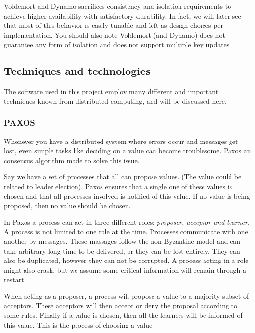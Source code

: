 Voldemort and Dynamo sacrifices consistency and isolation requirements to achieve higher availability with satisfactory durability.
In fact, we will later see that most of this behavior is easily tunable and left as design choices per implementation.
You should also note Voldemort (and Dynamo) does not guarantee any form of isolation and does not support multiple key updates.

\subsection{Techniques and technologies}
The software used in this project employ many different and important techniques known from distributed computing, and will be discussed here.

\subsubsection{PAXOS}
Whenever you have a distributed system where errors occur and messages get lost, even simple tasks like deciding on a value can become troublesome. Paxos an consensus algorithm made to solve this issue. 

Say we have a set of processes that all can propose values. (The value could be related to leader election). Paxos ensures that a single one of these values is chosen and that all processes involved is notified of this value. If no value is being proposed, then no value should be chosen. 

In Paxos a process can act in three different roles: {\it proposer, acceptor and learner}. A process is not limited to one role at the time. Processes communicate with one another by messages. These massages follow the non-Byzantine model and can take arbitrary long time to be delivered, or they can be lost entirely. They can also be duplicated, however they can not be corrupted. A process acting in a role might also crash, but we assume some critical information will remain through a restart. 

When acting as a proposer, a process will propose a value to a majority subset of acceptors. These acceptors will then accept or deny the proposal according to some rules. Finally if a value is chosen, then all the learners will be informed of this value. This is the process of choosing a value:

